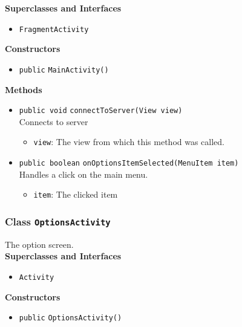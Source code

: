 \textbf{Superclasses and Interfaces}
\begin{itemize}
\item \lstinline|FragmentActivity|
\end{itemize}



\textbf{Constructors}
\begin{itemize}
\item \lstinline|public| \lstinline|MainActivity|\lstinline|()|




\end{itemize}


\textbf{Methods}
\begin{itemize}
\item \lstinline|public void| \lstinline|connectToServer|\lstinline|(View view)|\\
Connects to server
\begin{itemize}
\item \lstinline|view|: The view from which this method was called.
\end{itemize}



\item \lstinline|public boolean| \lstinline|onOptionsItemSelected|\lstinline|(MenuItem item)|\\
Handles a click on the main menu.
\begin{itemize}
\item \lstinline|item|: The clicked item
\end{itemize}



\end{itemize}

\subsubsection{Class \lstinline|OptionsActivity|}
The option screen. \\


\textbf{Superclasses and Interfaces}
\begin{itemize}
\item \lstinline|Activity|
\end{itemize}



\textbf{Constructors}
\begin{itemize}
\item \lstinline|public| \lstinline|OptionsActivity|\lstinline|()|




\end{itemize}


